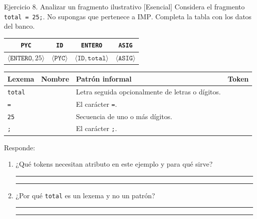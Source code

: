 \documentclass[11pt,spanish]{article}
\newcommand{\blank}[1][4cm]{\rule{#1}{0.4pt}}
\begin{document}
\begin{ejercicio}{Ejercicio 8. Analizar un fragmento ilustrativo \hfill {\small [Esencial]}}
Considera el fragmento \texttt{total = 25;}. No supongas que pertenece a \textsc{IMP}. Completa la tabla con los datos del banco.

\begin{center}
\small
\begin{tabular}{|c|c|c|c|}
\hline
\texttt{PYC} & \texttt{ID} & \texttt{ENTERO} & \texttt{ASIG} \tabularnewline
\hline
\(\langle\texttt{ENTERO},25\rangle\) & \(\langle\texttt{PYC}\rangle\) & \(\langle\texttt{ID},\texttt{total}\rangle\) & \(\langle\texttt{ASIG}\rangle\) \tabularnewline
\hline
\end{tabular}
\end{center}

\begin{center}
\small
\renewcommand{\arraystretch}{1.35}
\begin{tabular}{|p{}|p{}|p{}|p{}|}
\hline
\textbf{Lexema} & \textbf{Nombre} & \textbf{Patrón informal} & \textbf{Token} \tabularnewline
\hline
\texttt{total} & & Letra seguida opcionalmente de letras o dígitos. & \tabularnewline[0.72cm]
\hline
\texttt{=} & & El carácter \texttt{=}. & \tabularnewline[0.72cm]
\hline
\texttt{25} & & Secuencia de uno o más dígitos. & \tabularnewline[0.72cm]
\hline
\texttt{;} & & El carácter \texttt{;}. & \tabularnewline[0.72cm]
\hline
\end{tabular}
\end{center}

Responde:

\begin{enumerate}[leftmargin=*]
    \item ¿Qué tokens necesitan atributo en este ejemplo y para qué sirve?

    \ifrespuestas\else
    \blank[14cm]

    \blank[14cm]
    \fi

    \item ¿Por qué \texttt{total} es un lexema y no un patrón?

    \ifrespuestas\else
    \blank[14cm]

    \blank[14cm]
    \fi
\end{enumerate}
\end{ejercicio}
\end{document}
